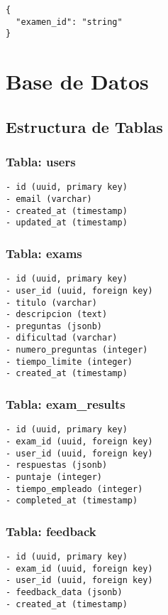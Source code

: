 \documentclass[12pt,a4paper]{report}
\begin{document}
\begin{lstlisting}
{
  "examen_id": "string"
}
\end{lstlisting}

\chapter{Base de Datos}

\section{Estructura de Tablas}

\subsection{Tabla: users}
\begin{lstlisting}
- id (uuid, primary key)
- email (varchar)
- created_at (timestamp)
- updated_at (timestamp)
\end{lstlisting}

\subsection{Tabla: exams}
\begin{lstlisting}
- id (uuid, primary key)
- user_id (uuid, foreign key)
- titulo (varchar)
- descripcion (text)
- preguntas (jsonb)
- dificultad (varchar)
- numero_preguntas (integer)
- tiempo_limite (integer)
- created_at (timestamp)
\end{lstlisting}

\subsection{Tabla: exam\_results}
\begin{lstlisting}
- id (uuid, primary key)
- exam_id (uuid, foreign key)
- user_id (uuid, foreign key)
- respuestas (jsonb)
- puntaje (integer)
- tiempo_empleado (integer)
- completed_at (timestamp)
\end{lstlisting}

\subsection{Tabla: feedback}
\begin{lstlisting}
- id (uuid, primary key)
- exam_id (uuid, foreign key)
- user_id (uuid, foreign key)
- feedback_data (jsonb)
- created_at (timestamp)
\end{lstlisting}
\end{document}
